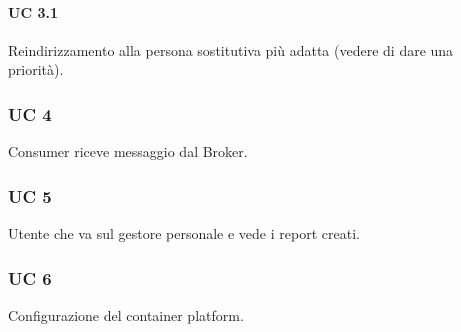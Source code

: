 			\paragraph{UC 3.1}
			Reindirizzamento alla persona sostitutiva più adatta (vedere di dare una priorità).
		
		\subsubsection{UC 4}
		Consumer riceve messaggio dal Broker.
		
		\subsubsection{UC 5}
		Utente che va sul gestore personale e vede i report creati.
		
		\subsubsection{UC 6}
		Configurazione del container platform.
		
		
		
		